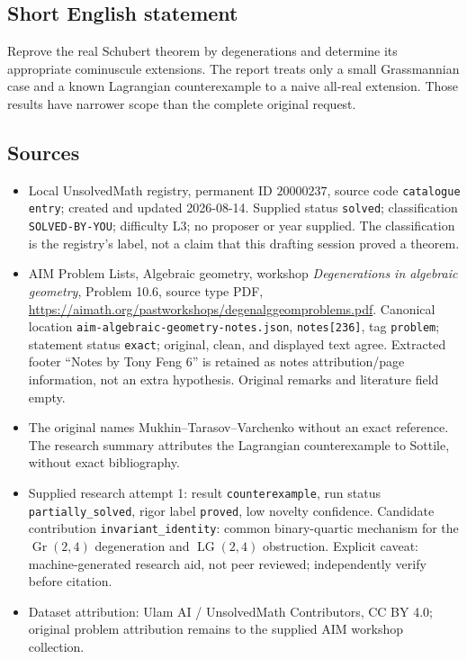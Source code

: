 \documentclass[11pt]{article}
\begin{document}
\subsection{Short English statement}
Reprove the real Schubert theorem by degenerations and determine its appropriate cominuscule extensions. The report treats only a small Grassmannian case and a known Lagrangian counterexample to a naive all-real extension. Those results have narrower scope than the complete original request.
\subsection{Sources}
\begin{itemize}
\item Local UnsolvedMath registry, permanent ID $20000237$, source code \texttt{catalogue entry}; created and updated 2026-08-14. Supplied status \texttt{solved}; classification \texttt{SOLVED-BY-YOU}; difficulty L3; no proposer or year supplied. The classification is the registry's label, not a claim that this drafting session proved a theorem.
\item AIM Problem Lists, Algebraic geometry, workshop \emph{Degenerations in algebraic geometry}, Problem 10.6, source type PDF, \url{https://aimath.org/pastworkshops/degenalggeomproblems.pdf}. Canonical location \texttt{aim-algebraic-geometry-notes.json}, \texttt{notes[236]}, tag \texttt{problem}; statement status \texttt{exact}; original, clean, and displayed text agree. Extracted footer ``Notes by Tony Feng 6'' is retained as notes attribution/page information, not an extra hypothesis. Original remarks and literature field empty.
\item The original names Mukhin--Tarasov--Varchenko without an exact reference. The research summary attributes the Lagrangian counterexample to Sottile, without exact bibliography.
\item Supplied research attempt 1: result \texttt{counterexample}, run status \texttt{partially\_solved}, rigor label \texttt{proved}, low novelty confidence. Candidate contribution \texttt{invariant\_identity}: common binary-quartic mechanism for the $\operatorname{Gr}(2,4)$ degeneration and $\operatorname{LG}(2,4)$ obstruction. Explicit caveat: machine-generated research aid, not peer reviewed; independently verify before citation.
\item Dataset attribution: Ulam AI / UnsolvedMath Contributors, CC BY 4.0; original problem attribution remains to the supplied AIM workshop collection.
\end{itemize}
\end{document}
